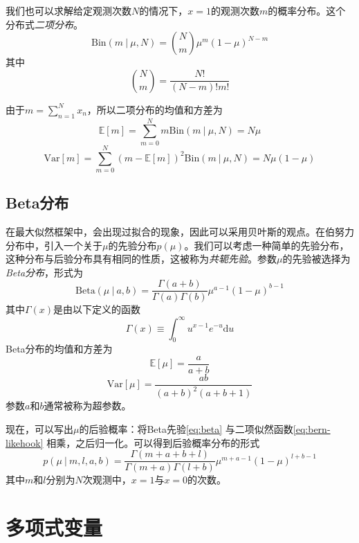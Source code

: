 \documentclass[11pt]{ctexbook}
\begin{document}
我们也可以求解给定观测次数$N$的情况下，$x=1$的观测次数$m$的概率分布。这个分布式\emph{二项分布}。
\begin{equation}
	\mathrm{Bin}(m\ |\ \mu, N) = \binom{N}{m}\mu^m(1-\mu)^{N-m}
\end{equation}
其中
\begin{equation}
	\binom{N}{m} = \frac{N!}{(N-m)!m!}
\end{equation}

由于$m = \sum_{n=1}^{N}x_n$，所以二项分布的均值和方差为
\begin{equation}
	\mathbb E[m] = \sum_{m=0}^{N}m\mathrm{Bin}(m\ |\ \mu, N) = N\mu
\end{equation}
\begin{equation}
	\mathrm{Var}[m] = \sum_{m=0}^{N}(m-\mathbb E[m])^2\mathrm{Bin}(m\ |\ \mu, N) = N\mu(1-\mu)
\end{equation}
\subsection{Beta分布}
在最大似然框架中，会出现过拟合的现象，因此可以采用贝叶斯的观点。在伯努力分布中，引入一个关于$\mu$的先验分布$p(\mu)$。我们可以考虑一种简单的先验分布，这种分布与后验分布具有相同的性质，这被称为\emph{共轭先验}。参数$\mu$的先验被选择为\emph{Beta分布}，形式为
\begin{equation}
	\label{eq:beta}
	\mathrm{Beta}(\mu\ |\ a, b) = \frac{\Gamma(a+b)}{\Gamma(a)\Gamma(b)}\mu^{a-1}(1-\mu)^{b-1}
\end{equation}
其中$\Gamma(x)$是由以下定义的函数
\begin{equation}
	\Gamma(x) \equiv \int_0^{\infty} u^{x-1}e^{-u}\mathrm{d}u
\end{equation}
Beta分布的均值和方差为
\begin{equation}
	\mathbb E[\mu] = \frac{a}{a+b}
\end{equation}
\begin{equation}
	\mathrm{Var}[\mu] = \frac{ab}{(a+b)^2(a+b+1)}
\end{equation}
参数$a$和$b$通常被称为超参数。

现在，可以写出$\mu$的后验概率：将Beta先验\ref{eq:beta} 与二项似然函数\ref{eq:bern-likehook} 相乘，之后归一化。可以得到后验概率分布的形式	
\begin{equation}
	p(\mu\ |\ m, l, a, b) = \frac{\Gamma(m+a+b+l)}{\Gamma(m+a)\Gamma(l+b)}\mu^{m+a-1}(1-\mu)^{l+b-1}
\end{equation}
其中$m$和$l$分别为$N$次观测中，$x=1$与$x=0$的次数。
\section{多项式变量}
\end{document}
